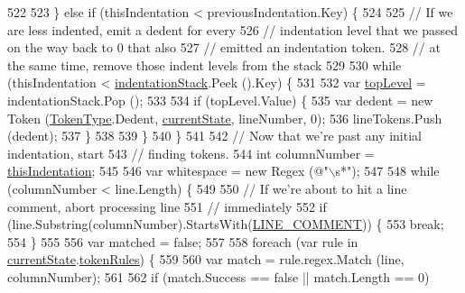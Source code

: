 \begin{DoxyCode}
522 
523             \} \textcolor{keywordflow}{else} \textcolor{keywordflow}{if} (thisIndentation < previousIndentation.Key) \{
524 
525                 \textcolor{comment}{// If we are less indented, emit a dedent for every}
526                 \textcolor{comment}{// indentation level that we passed on the way back to 0 that also}
527                 \textcolor{comment}{// emitted an indentation token.}
528                 \textcolor{comment}{// at the same time, remove those indent levels from the stack}
529 
530                 \textcolor{keywordflow}{while} (thisIndentation < \hyperlink{a00121_a6631a1b1a9109258ab18927e7587ff9b}{indentationStack}.Peek ().Key) \{
531 
532                     var \hyperlink{a00336_a8b7e5c0b2c6870eaa8f9454b4f33678b}{topLevel} = indentationStack.Pop ();
533 
534                     \textcolor{keywordflow}{if} (topLevel.Value) \{
535                         var dedent = \textcolor{keyword}{new} Token (\hyperlink{a00045_a301aa7c866593a5b625a8fc158bbeace}{TokenType}.Dedent, 
      \hyperlink{a00121_ac90b7dce8103425a148f9e8588f14137}{currentState}, lineNumber, 0);
536                         lineTokens.Push (dedent);
537                     \}
538 
539                 \}
540             \}
541 
542             \textcolor{comment}{// Now that we're past any initial indentation, start}
543             \textcolor{comment}{// finding tokens.}
544             \textcolor{keywordtype}{int} columnNumber = \hyperlink{a00336_a0e59365a4aa5811f6495b92a51e23573}{thisIndentation};
545 
546             var whitespace = \textcolor{keyword}{new} Regex (\textcolor{stringliteral}{@"\(\backslash\)s*"});
547 
548             \textcolor{keywordflow}{while} (columnNumber < line.Length) \{
549 
550                 \textcolor{comment}{// If we're about to hit a line comment, abort processing line}
551                 \textcolor{comment}{// immediately}
552                 \textcolor{keywordflow}{if} (line.Substring(columnNumber).StartsWith(\hyperlink{a00121_a29c457125cc4876f8571f5d9afa372e2}{LINE\_COMMENT})) \{
553                     \textcolor{keywordflow}{break};
554                 \}
555 
556                 var matched = \textcolor{keyword}{false};
557 
558                 \textcolor{keywordflow}{foreach} (var rule \textcolor{keywordflow}{in} \hyperlink{a00121_ac90b7dce8103425a148f9e8588f14137}{currentState}.\hyperlink{a00122_adf6563b1dc6f3ef80ed13c2b15b7be03}{tokenRules}) \{
559 
560                     var match = rule.regex.Match (line, columnNumber);
561 
562                     \textcolor{keywordflow}{if} (match.Success == \textcolor{keyword}{false} || match.Length == 0)

\end{DoxyCode}
